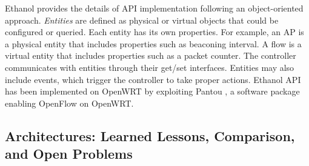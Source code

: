 Ethanol \cite{Ethanol} provides the details of API implementation following an object-oriented approach.
\textit{Entities} are defined as physical or virtual objects that could be configured or queried.
Each entity has its own properties.
For example, an AP is a physical entity that includes properties such as beaconing interval.
A flow is a virtual entity that includes properties such as a packet counter.
The controller communicates with entities through their get/set interfaces. 
Entities may also include events, which trigger the controller to take proper actions.
Ethanol API has been implemented on OpenWRT \cite{OpenWRT} by exploiting Pantou \cite{Pantou}, a software package enabling OpenFlow on OpenWRT.










%

\subsection{Architectures: Learned Lessons, Comparison, and Open Problems}
\label{archComp}

